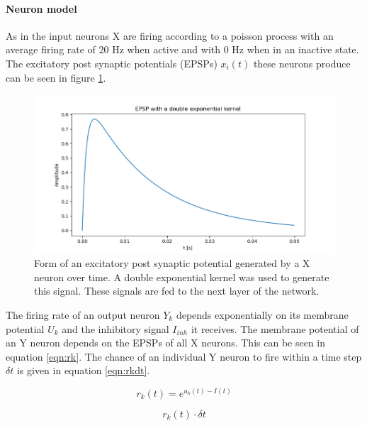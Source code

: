 \paragraph{Neuron model}

As in \citet{nessler} the input neurons X are firing according to a poisson process with an average firing rate of 20 Hz when active and with 0 Hz when in an inactive state. The excitatory post synaptic potentials (EPSPs) $x_i(t)$ these neurons produce can be seen in figure \ref{fig:XSpike}.

\begin{figure}
  \includegraphics[width=\linewidth]{figures/XSpike.png}
  \caption{Form of an excitatory post synaptic potential generated by a X neuron over time. A double exponential kernel was used to generate this signal. These signals are fed to the next layer of the network. }
  \label{fig:XSpike}
\end{figure}

The firing rate of an output neuron $Y_k$ depends exponentially on its membrane potential $U_k$ and the inhibitory signal $I_{inh}$ it receives. The membrane potential of an Y neuron depends on the EPSPs of all X neurons. This can be seen in equation \ref{eqn:rk}. The chance of an individual Y neuron to fire within a time step $\delta t$ is given in equation \ref{eqn:rkdt}.

\begin{equation}
\label{eqn:rk}
r_k(t) = e^{u_k(t) - I(t)}
\end{equation}

\begin{equation}
\label{eqn:rkdt}
r_k(t) \cdot \delta t
\end{equation}


